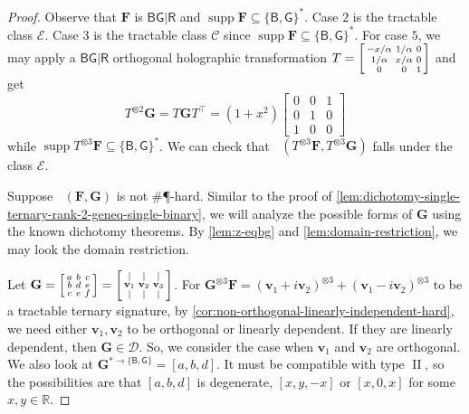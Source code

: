 \documentclass[11pt]{article}
\DeclareMathOperator{\hols}{Holant^*}
\DeclareMathOperator{\holts}{Holant^*_3}
\DeclareMathOperator{\supp}{supp}
\DeclareMathOperator{\typeii}{II}
\newcommand{\db}{\mathsf{B}}
\newcommand{\dg}{\mathsf{G}}
\newcommand{\dr}{\mathsf{R}}
\newcommand{\sph}{\#\P-hard\xspace}
\newcommand{\teh}{^{\otimes 3}}
\newcommand{\tew}{^{\otimes 2}}
\newcommand{\transpose}{^\intercal}
\newcommand{\domres}[1]{
  ^{*\to\{#1\}}
}
\newcommand{\tractBG}{$\mathscr{C}$\xspace}
\newcommand{\tractBGGRBR}{$\mathscr{E}$\xspace}
\begin{document}
\begin{proof}
  Observe that $\mathbf{F}$ is $\db \dg | \dr$ and $\supp \mathbf{F} \subseteq \{\db, \dg\}^*$.
  Case $2$ is the tractable class \tractBGGRBR.
  Case $3$ is the tractable class \tractBG since $\supp \mathbf{F} \subseteq \{\db, \dg\}^*$.
  For case $5$, we may apply a $\db\dg|\dr$ orthogonal holographic transformation $T = \begin{bsmallmatrix}
    -x/\alpha & 1/\alpha & 0 \\
    1/\alpha & x/\alpha & 0 \\
    0 & 0 & 1
  \end{bsmallmatrix}$ and get
  \[
    T \tew \mathbf{G} = T \mathbf{G} T\transpose = (1 + x^2) \begin{bmatrix}
      0 & 0 & 1 \\
      0 & 1 & 0 \\
      1 & 0 & 0
    \end{bmatrix}
  \] while $\supp T \teh \mathbf{F} \subseteq \{\db, \dg\}^*$.
  We can check that $\hols(T \teh \mathbf{F}, T \teh\mathbf{G})$ falls under the class \tractBGGRBR.

  Suppose $\holts(\mathbf{F}, \mathbf{G})$ is not \sph.
  Similar to the proof of \cref{lem:dichotomy-single-ternary-rank-2-geneq-single-binary}, we will analyze the possible forms of $\mathbf{G}$ using the known dichotomy theorems.
  By \cref{lem:z-eqbg} and \cref{lem:domain-restriction}, we may look the domain restriction.

  Let $\mathbf{G} = \begin{bsmallmatrix}
    a & b & c \\
    b & d & e \\
    c & e & f
    \end{bsmallmatrix} = \begin{bsmallmatrix}
    \vert & \vert & \vert \\
    \mathbf{v}_1 & \mathbf{v}_2 & \mathbf{v}_3 \\
    \vert & \vert & \vert
  \end{bsmallmatrix}$.
  For $\mathbf{G}\teh \mathbf{F} = (\mathbf{v}_1 + i \mathbf{v}_2)\teh + (\mathbf{v}_1 - i \mathbf{v}_2)\teh$ to be a tractable ternary signature, by \cref{cor:non-orthogonal-linearly-independent-hard}, we need either $\mathbf{v}_1, \mathbf{v}_2$ to be orthogonal or linearly dependent.
  If they are linearly dependent, then $\mathbf{G} \in \mathcal{D}$.
  So, we consider the case when $\mathbf{v}_1$ and $\mathbf{v}_2$ are orthogonal.
  We also look at $\mathbf{G}\domres{\db, \dg} = [a, b, d]$.
  It must be compatible with type $\typeii$, so the possibilities are that $[a, b, d]$ is degenerate, $[x, y, -x]$ or $[x, 0, x]$ for some $x, y \in \mathbb{R}$.


\end{proof}
\end{document}
